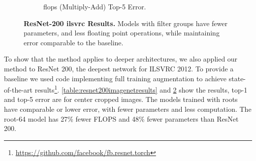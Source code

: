 \documentclass[thesis]{subfiles}
\begin{document}
\begin{figure}[tbp]
\begin{subfigure}[b]{\textwidth}
			\centering
			\caption{\gls{flops} (Multiply-Add) \vs Top-5 Error.}
			\label{fig:resnet200ma}
		\end{subfigure}
		\caption[ResNet-200 \gls{ilsvrc} results]{\textbf{ResNet-200 \gls{ilsvrc} Results.} Models with filter groups have fewer parameters, and less floating point operations, while maintaining error comparable to the baseline.}
		\label{fig:resnet200plots}
	\end{figure}
	To show that the method applies to deeper architectures, we also applied our method to ResNet 200, the deepest network for ILSVRC 2012. To provide a baseline we used code implementing full training augmentation to achieve state-of-the-art results\footnote{\url{https://github.com/facebook/fb.resnet.torch}}. \cref{table:resnet200imagenetresults} and \cref{fig:resnet200plots} show the results, top-1 and top-5 error are for center cropped images. The models trained with roots have comparable or lower error, with fewer parameters and less computation. The root-64 model has 27\% fewer FLOPS and 48\% fewer parameters than ResNet 200.
\end{document}
